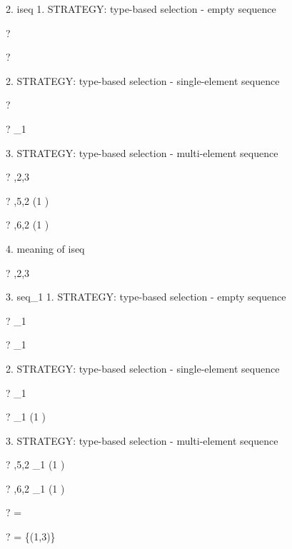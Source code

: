 \documentclass{article}
\begin{document}
 2. iseq
     1. STRATEGY: type-based selection - empty sequence
\begin{zed} \vdash? \langle \rangle \in \iseq \nat \end{zed}
\begin{zed} \vdash? \langle \rangle \in \iseq \emptyset[\nat] \end{zed}
     2. STRATEGY: type-based selection - single-element sequence
\begin{zed} \vdash?  \rangle \in \iseq \nat \end{zed}
\begin{zed} \vdash?  \rangle \notin \iseq \nat_1 \end{zed}
     3. STRATEGY: type-based selection - multi-element sequence
\begin{zed} \vdash? ,2,3 \rangle \in \iseq \nat \end{zed}
\begin{zed} \vdash? ,5,2 \rangle \in \iseq (1 ) \end{zed}
\begin{zed} \vdash? ,6,2 \rangle \notin \iseq (1 ) \end{zed}
     4. meaning of iseq
\begin{zed} \vdash? ,2,3 \rangle \notin \iseq \nat \end{zed}

 3. seq_1
     1. STRATEGY: type-based selection - empty sequence
\begin{zed} \vdash? \langle \rangle \notin \seq_1 \nat \end{zed}
\begin{zed} \vdash? \langle \rangle \notin \seq_1 \emptyset[\nat] \end{zed}
     2. STRATEGY: type-based selection - single-element sequence
\begin{zed} \vdash?  \rangle \in \seq_1 \nat \end{zed}
\begin{zed} \vdash?  \rangle \in \seq_1 (1 ) \end{zed}
     3. STRATEGY: type-based selection - multi-element sequence
\begin{zed} \vdash? ,5,2 \rangle \in \seq_1 (1 ) \end{zed}
\begin{zed} \vdash? ,6,2 \rangle \notin \seq_1 (1 ) \end{zed}

\begin{zed} \vdash? \langle \rangle = \emptyset[\nat \cross \power\arithmos] \end{zed}
\begin{zed} \vdash?  \rangle = \{(1,3)\} \end{zed}
\end{document}
